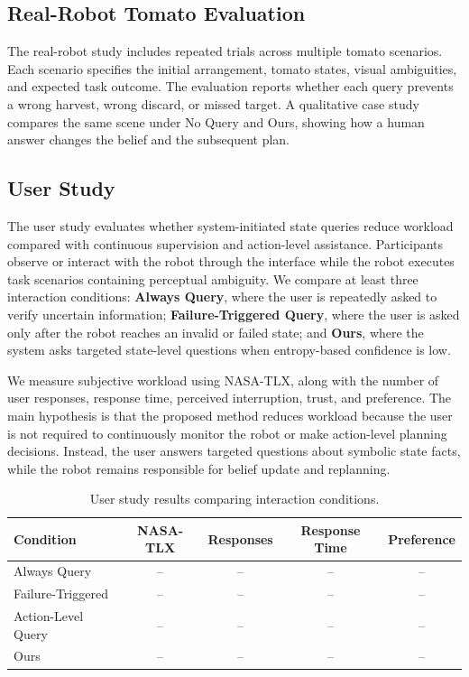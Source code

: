 \subsection{Real-Robot Tomato Evaluation}

The real-robot study includes repeated trials across multiple tomato scenarios. Each scenario specifies the initial arrangement, tomato states, visual ambiguities, and expected task outcome. The evaluation reports whether each query prevents a wrong harvest, wrong discard, or missed target. A qualitative case study compares the same scene under No Query and Ours, showing how a human answer changes the belief and the subsequent plan.

\subsection{User Study}
\label{sec:user_study}

The user study evaluates whether system-initiated state queries reduce workload compared with continuous supervision and action-level assistance. Participants observe or interact with the robot through the interface while the robot executes task scenarios containing perceptual ambiguity. We compare at least three interaction conditions: \textbf{Always Query}, where the user is repeatedly asked to verify uncertain information; \textbf{Failure-Triggered Query}, where the user is asked only after the robot reaches an invalid or failed state; and \textbf{Ours}, where the system asks targeted state-level questions when entropy-based confidence is low.

We measure subjective workload using NASA-TLX, along with the number of user responses, response time, perceived interruption, trust, and preference. The main hypothesis is that the proposed method reduces workload because the user is not required to continuously monitor the robot or make action-level planning decisions. Instead, the user answers targeted questions about symbolic state facts, while the robot remains responsible for belief update and replanning.

\begin{table}[t]
\centering
\caption{User study results comparing interaction conditions.}
\label{tab:user_study}
\begin{tabular}{lcccc}
\toprule
Condition & NASA-TLX & Responses & Response Time & Preference \\
\midrule
Always Query & -- & -- & -- & -- \\
Failure-Triggered & -- & -- & -- & -- \\
Action-Level Query & -- & -- & -- & -- \\
Ours & -- & -- & -- & -- \\
\bottomrule
\end{tabular}
\end{table}
